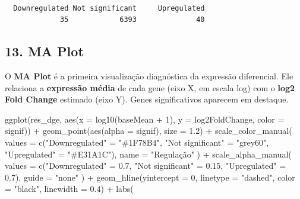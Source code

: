 \documentclass[
  letterpaper,
  DIV=11,
  numbers=noendperiod]{scrreprt}
\newenvironment{Shaded}{\begin{snugshade}}{\end{snugshade}}
\newcommand{\AttributeTok}[1]{\textcolor[rgb]{0.40,0.45,0.13}{#1}}
\newcommand{\DecValTok}[1]{\textcolor[rgb]{0.68,0.00,0.00}{#1}}
\newcommand{\FloatTok}[1]{\textcolor[rgb]{0.68,0.00,0.00}{#1}}
\newcommand{\FunctionTok}[1]{\textcolor[rgb]{0.28,0.35,0.67}{#1}}
\newcommand{\NormalTok}[1]{\textcolor[rgb]{0.00,0.23,0.31}{#1}}
\newcommand{\OtherTok}[1]{\textcolor[rgb]{0.00,0.23,0.31}{#1}}
\newcommand{\SpecialCharTok}[1]{\textcolor[rgb]{0.37,0.37,0.37}{#1}}
\newcommand{\StringTok}[1]{\textcolor[rgb]{0.13,0.47,0.30}{#1}}
\begin{document}
\begin{verbatim}

  Downregulated Not significant     Upregulated 
             35            6393              40 
\end{verbatim}

\subsection{13. MA Plot}\label{ma-plot}

O \textbf{MA Plot} é a primeira visualização diagnóstica da expressão
diferencial. Ele relaciona a \textbf{expressão média} de cada gene (eixo
X, em escala log) com o \textbf{log2 Fold Change} estimado (eixo Y).
Genes significativos aparecem em destaque.

\begin{Shaded}
\begin{Highlighting}[]
\FunctionTok{ggplot}\NormalTok{(res\_dge, }\FunctionTok{aes}\NormalTok{(}\AttributeTok{x =} \FunctionTok{log10}\NormalTok{(baseMean }\SpecialCharTok{+} \DecValTok{1}\NormalTok{), }\AttributeTok{y =}\NormalTok{ log2FoldChange, }\AttributeTok{color =}\NormalTok{ signif)) }\SpecialCharTok{+}
  \FunctionTok{geom\_point}\NormalTok{(}\FunctionTok{aes}\NormalTok{(}\AttributeTok{alpha =}\NormalTok{ signif), }\AttributeTok{size =} \FloatTok{1.2}\NormalTok{) }\SpecialCharTok{+}
  \FunctionTok{scale\_color\_manual}\NormalTok{(}
    \AttributeTok{values =} \FunctionTok{c}\NormalTok{(}\StringTok{"Downregulated"} \OtherTok{=} \StringTok{"\#1F78B4"}\NormalTok{,}
               \StringTok{"Not significant"} \OtherTok{=} \StringTok{"grey60"}\NormalTok{,}
               \StringTok{"Upregulated"} \OtherTok{=} \StringTok{"\#E31A1C"}\NormalTok{),}
    \AttributeTok{name =} \StringTok{"Regulação"}
\NormalTok{  ) }\SpecialCharTok{+}
  \FunctionTok{scale\_alpha\_manual}\NormalTok{(}
    \AttributeTok{values =} \FunctionTok{c}\NormalTok{(}\StringTok{"Downregulated"} \OtherTok{=} \FloatTok{0.7}\NormalTok{,}
               \StringTok{"Not significant"} \OtherTok{=} \FloatTok{0.15}\NormalTok{,}
               \StringTok{"Upregulated"} \OtherTok{=} \FloatTok{0.7}\NormalTok{),}
    \AttributeTok{guide =} \StringTok{"none"}
\NormalTok{  ) }\SpecialCharTok{+}
  \FunctionTok{geom\_hline}\NormalTok{(}\AttributeTok{yintercept =} \DecValTok{0}\NormalTok{, }\AttributeTok{linetype =} \StringTok{"dashed"}\NormalTok{, }\AttributeTok{color =} \StringTok{"black"}\NormalTok{, }\AttributeTok{linewidth =} \FloatTok{0.4}\NormalTok{) }\SpecialCharTok{+}
  \FunctionTok{labs}\NormalTok{(}

\end{Highlighting}
\end{Shaded}
\end{document}
